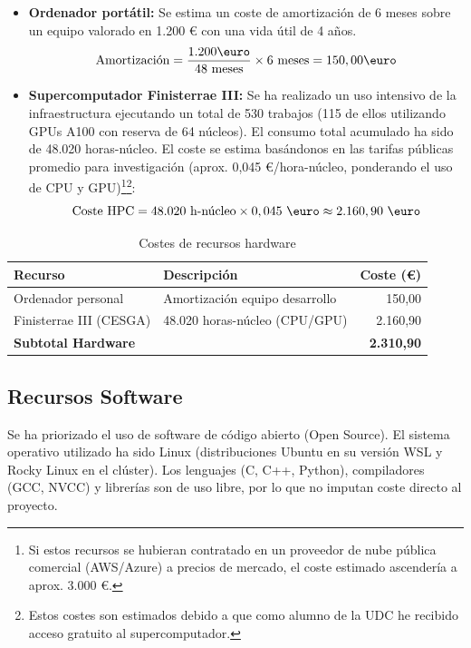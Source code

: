\begin{itemize}
    \item \textbf{Ordenador portátil:} Se estima un coste de amortización de 6 meses sobre un equipo valorado en 1.200 \euro{} con una vida útil de 4 años.
    \[ \text{Amortización} = \frac{1.200 \text{\euro}}{48 \text{ meses}} \times 6 \text{ meses} = 150,00 \text{\euro} \]

    \item \textbf{Supercomputador Finisterrae III:} Se ha realizado un uso intensivo de la infraestructura ejecutando un total de 530 trabajos (115 de ellos utilizando GPUs A100 con reserva de 64 núcleos).
     El consumo total acumulado ha sido de 48.020 horas-núcleo.
     El coste se estima basándonos en las tarifas públicas promedio para investigación (aprox. 0,045 \euro/hora-núcleo, ponderando el uso de CPU y GPU)\footnote{Si estos recursos se hubieran contratado en un proveedor de nube pública comercial (AWS/Azure) a precios de mercado, el coste estimado ascendería a aprox. 3.000 \euro.}\footnote{Estos costes son estimados debido a que como alumno de la UDC he recibido acceso gratuito al supercomputador.}:
    \[ \text{Coste HPC} = 48.020 \text{ h-núcleo} \times 0,045 \text{ \euro} \approx 2.160,90 \text{ \euro} \]
\end{itemize}

\begin{table}[h!]
    \centering
    \begin{tabular}{|l|l|r|}
        \hline
        \textbf{Recurso} & \textbf{Descripción} & \textbf{Coste (\euro)} \\ \hline
        Ordenador personal & Amortización equipo desarrollo & 150,00 \\
        Finisterrae III (CESGA) & 48.020 horas-núcleo (CPU/GPU) & 2.160,90 \\ \hline
        \textbf{Subtotal Hardware} & & \textbf{2.310,90} \\ \hline
    \end{tabular}
    \caption{Costes de recursos hardware}
    \label{tab:costes_hw}
\end{table}

\subsection{Recursos Software}\label{subsec:recursos-software}

Se ha priorizado el uso de software de código abierto (Open Source).
El sistema operativo utilizado ha sido Linux (distribuciones Ubuntu en su versión WSL y Rocky Linux en el clúster).
Los lenguajes (C, C++, Python), compiladores (GCC, NVCC) y librerías son de uso libre, por lo que no imputan coste directo al proyecto.

